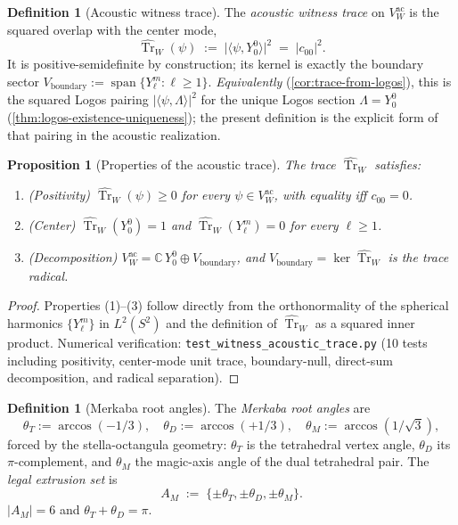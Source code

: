 \documentclass[11pt,a4paper]{article}
\theoremstyle{plain}
\newtheorem{proposition}[theorem]{Proposition}
\theoremstyle{definition}
\newtheorem{definition}[theorem]{Definition}
\theoremstyle{remark}
\numberwithin{equation}{section}
\newcommand{\Complex}{\mathbb{C}}
\DeclareMathOperator{\Tr}{Tr}
\DeclareMathOperator{\spn}{span}
\begin{document}
\begin{definition}[Acoustic witness trace]
\label{def:witness-trace-acoustic}
The \emph{acoustic witness trace} on $V_W^{\mathrm{ac}}$ is the
squared overlap with the center mode,
\[
  \widehat{\Tr}_W(\psi)
  \;:=\;\bigl|\langle\psi,Y_0^0\rangle\bigr|^2
  \;=\;|c_{00}|^2.
\]
It is positive-semidefinite by construction; its kernel is exactly
the boundary sector
$V_{\mathrm{boundary}}:=\spn\bigl\{Y_\ell^m:\ell\ge 1\bigr\}$.
\emph{Equivalently} (\cref{cor:trace-from-logos}), this is the
squared Logos pairing
$|\langle\psi,\Lambda\rangle|^2$ for the unique Logos section
$\Lambda=Y_0^0$ (\cref{thm:logos-existence-uniqueness}); the
present definition is the explicit form of that pairing in the
acoustic realization.
\end{definition}

\medskip
\begin{proposition}[Properties of the acoustic trace]
\label{prop:acoustic-trace-properties}
The trace $\widehat{\Tr}_W$ satisfies:
\begin{enumerate}
  \item (Positivity) $\widehat{\Tr}_W(\psi)\ge 0$ for every
        $\psi\in V_W^{\mathrm{ac}}$, with equality iff $c_{00}=0$.
  \item (Center) $\widehat{\Tr}_W(Y_0^0)=1$ and
        $\widehat{\Tr}_W(Y_\ell^m)=0$ for every $\ell\ge 1$.
  \item (Decomposition)
        $V_W^{\mathrm{ac}}=\Complex\,Y_0^0\oplus V_{\mathrm{boundary}}$,
        and $V_{\mathrm{boundary}}=\ker\widehat{\Tr}_W$ is the
        \emph{trace radical}.
\end{enumerate}
\end{proposition}

\begin{proof}
Properties (1)--(3) follow directly from the orthonormality of the
spherical harmonics $\{Y_\ell^m\}$ in $L^2(S^2)$ and the definition
of $\widehat{\Tr}_W$ as a squared inner product.  Numerical
verification: \texttt{test\_witness\_acoustic\_trace.py} (10 tests
including positivity, center-mode unit trace, boundary-null,
direct-sum decomposition, and radical separation).
\end{proof}

\begin{definition}[Merkaba root angles]
\label{def:merkaba-angles}
The \emph{Merkaba root angles} are
\[
  \theta_T:=\arccos(-1/3),\quad
  \theta_D:=\arccos(+1/3),\quad
  \theta_M:=\arccos(1/\sqrt 3),
\]
forced by the stella-octangula geometry: $\theta_T$ is the
tetrahedral vertex angle, $\theta_D$ its $\pi$-complement, and
$\theta_M$ the magic-axis angle of the dual tetrahedral pair.  The
\emph{legal extrusion set} is
\[
  A_M\;:=\;\{\pm\theta_T,\pm\theta_D,\pm\theta_M\}.
\]
$|A_M|=6$ and $\theta_T+\theta_D=\pi$.
\end{definition}
\end{document}
